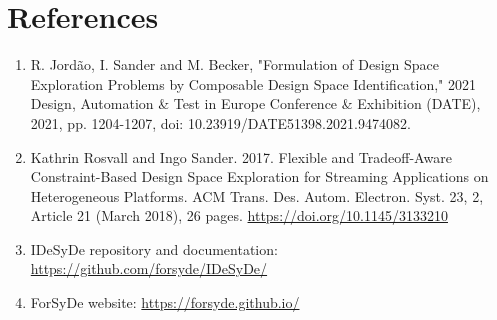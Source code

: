 \documentclass[12pt,notitlepage]{article}
\begin{document}

\section{References}
\begin{enumerate}
\item R. Jordão, I. Sander and M. Becker, "Formulation of Design Space Exploration Problems by Composable Design Space Identification," 2021 Design, Automation \& Test in Europe Conference \& Exhibition (DATE), 2021, pp. 1204-1207, doi: 10.23919/DATE51398.2021.9474082.
\item Kathrin Rosvall and Ingo Sander. 2017. Flexible and Tradeoff-Aware Constraint-Based Design Space Exploration for Streaming Applications on Heterogeneous Platforms. ACM Trans. Des. Autom. Electron. Syst. 23, 2, Article 21 (March 2018), 26 pages. \url{https://doi.org/10.1145/3133210}
\item IDeSyDe repository and documentation: \url{https://github.com/forsyde/IDeSyDe/}
\item ForSyDe website: \url{https://forsyde.github.io/}
\end{enumerate}
\end{document}
